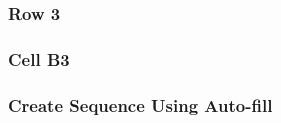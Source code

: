 \documentclass[color=usenames,dvipsnames]{beamer}
\begin{document}
\begin{frame}
  \frametitle{Row 3}
\end{frame}



\begin{frame}
  \frametitle{Cell B3}
\end{frame}



\begin{frame}
  \frametitle{Create Sequence Using Auto-fill}
\end{frame}
\end{document}
